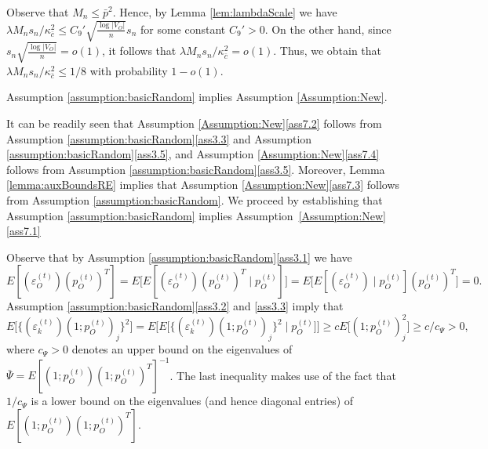 \documentclass[opre,nonblindrev]{informs3} %
\begin{document}
\begin{APPENDIX}{}
Observe that $M_n\leq \bar{p}^2$. Hence, by Lemma \ref{lem:lambdaScale} we have
$\lambda M_n s_n /\kappa^2_{\bar{c}} \leq C_9' \sqrt{\frac{\log|V_O|}{n}} s_n$ for some constant $C_9'>0$.
On the other hand, since
$s_n \sqrt{\frac{\log |V_O|}{n}}  = o(1)$, it follows that
$\lambda M_n s_n /\kappa^2_{\bar{c}}=o(1)$. Thus, we obtain that
$\lambda M_n s_n /\kappa^2_{\bar{c}} \leq  1/8$
with probability $1-o(1)$.
\hfill \halmos
\endproof


\begin{lemma}\label{lem:assBasicImpliesNew}
	Assumption \ref{assumption:basicRandom} implies Assumption \ref{Assumption:New}.
\end{lemma}
It can be readily seen that
Assumption \ref{Assumption:New}\ref{ass7.2}
follows from
Assumption \ref{assumption:basicRandom}\ref{ass3.3} and Assumption \ref{assumption:basicRandom}\ref{ass3.5},
and
Assumption \ref{Assumption:New}\ref{ass7.4}
follows from
Assumption \ref{assumption:basicRandom}\ref{ass3.5}.
Moreover, Lemma \ref{lemma:auxBoundsRE} implies that
Assumption \ref{Assumption:New}\ref{ass7.3}
follows from Assumption \ref{assumption:basicRandom}.
We proceed by establishing
that Assumption \ref{assumption:basicRandom} implies
Assumption~\ref{Assumption:New}\ref{ass7.1}

Observe that by 
Assumption \ref{assumption:basicRandom}\ref{ass3.1} we have
\begin{equation}\label{Anew:p10}
{E}[({\varepsilon}^{(t)}_O) ({p}^{(t)}_O)^T ]  
=
E\bigg[
{E}[({\varepsilon}^{(t)}_O) ({p}^{(t)}_O)^T 
\mid p_O^{(t)}
] 
\bigg]= 
E\bigg[
{E}[({\varepsilon}^{(t)}_O) 
\mid p_O^{(t)}
] 
({p}^{(t)}_O)^T 
\bigg]=0.
\end{equation}
Assumption \ref{assumption:basicRandom}\ref{ass3.2} and \ref{ass3.3} imply that
\begin{equation} \label{Anew:p11}
E\bigg[  \{
(\varepsilon_{k}^{(t)}) (1;p_O^{(t)})_j \}^2\bigg]
=
E\bigg[  E \bigg[ \{
(\varepsilon_{k}^{(t)}) (1;p_O^{(t)})_j \}^2 \mid p_O^{(t)} \bigg]  \bigg]
\geq c
E\bigg[  (1;p_O^{(t)})_j ^2\bigg] \geq  c/ c_\Psi>0,
\end{equation}
where $c_\Psi>0$ denotes an upper bound on the eigenvalues of $\bar\Psi=E[(1;p_O^{(t)})(1;p_O^{(t)})^T]^{-1}$.
The last inequality makes use of the fact that $1/c_\Psi$  is a lower bound on the eigenvalues (and hence diagonal entries) of
$E[(1;p_O^{(t)})(1;p_O^{(t)})^T]$.


\end{APPENDIX}
\end{document}
